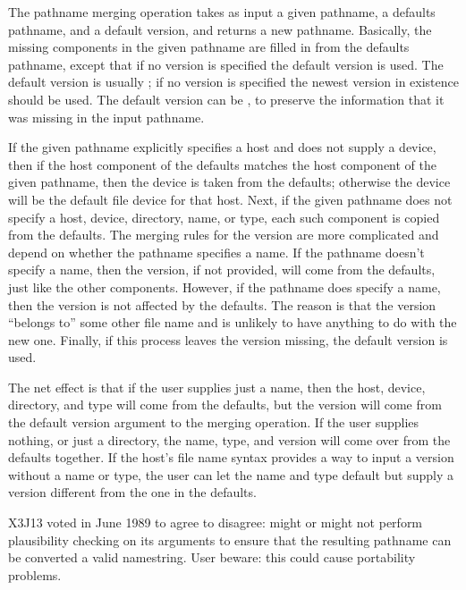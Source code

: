 \begin{defun}[Function]
The pathname merging operation takes as input a given pathname, a
defaults pathname, and a default version, and returns a
new pathname.  Basically, the missing components in the given pathname
are filled in from the defaults pathname, except that
if no version is specified the
default version is used.
The default version is usually ; if no version is specified
the newest version in existence should be used.  The default
version can be {\nil}, to preserve the information that it was missing
in the input pathname.

If the
given pathname explicitly specifies a host and does not supply a device, then
if the host component of the defaults matches the host component
of the given pathname, then the device is taken from the defaults;
otherwise
the device will be the default file device for that host.  Next, if
the
given pathname does not specify a host, device, directory, name,
or type, each such
component is copied from the defaults.
The merging rules for the version are more complicated and
depend on whether the pathname specifies a name.  If the pathname
doesn't specify a name, then the version, if not provided, will
come from the defaults, just like the other components.  However, if the
pathname does specify a name, then the version is not affected
by the defaults.  The reason is that the version
``belongs to'' some other file name and is unlikely to have anything to do
with the new one.  Finally, if this process leaves the
version missing, the default version is used.

The net effect is that if the user supplies just a name, then the
host, device, directory, and type will come from the defaults, but the
version will come from the default version
argument to the merging operation.  If the user supplies nothing, or
just a directory, the name, type, and version will come over from
the defaults together.  If the host's file name syntax provides a way
to input a version without a name or type, the user can let the name
and type
default but supply a version different from the one in the defaults.

\begin{newer}
X3J13 voted in June 1989  to agree to disagree:
 might or might not perform plausibility checking
on its arguments to ensure that the resulting pathname can be converted
a valid namestring.  User beware: this could cause portability problems.


\end{newer}
\end{defun}
